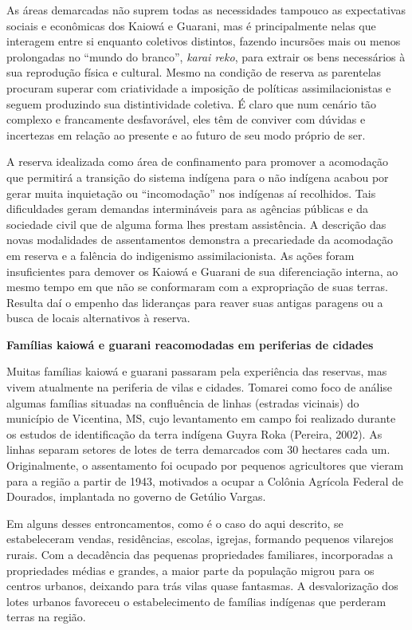 As áreas demarcadas não suprem todas as necessidades tampouco as
expectativas sociais e econômicas dos Kaiowá e Guarani, mas é
principalmente nelas que interagem entre si enquanto coletivos
distintos, fazendo incursões mais ou menos prolongadas no ``mundo do
branco'', \emph{karai reko}, para extrair os bens necessários à sua
reprodução física e cultural. Mesmo na condição de reserva as parentelas
procuram superar com criatividade a imposição de políticas
assimilacionistas e seguem produzindo sua distintividade coletiva. É
claro que num cenário tão complexo e francamente desfavorável, eles têm
de conviver com dúvidas e incertezas em relação ao presente e ao futuro
de seu modo próprio de ser.

A reserva idealizada como área de confinamento para promover a
acomodação que permitirá a transição do sistema indígena para o não
indígena acabou por gerar muita inquietação ou ``incomodação'' nos
indígenas aí recolhidos. Tais dificuldades geram demandas intermináveis
para as agências públicas e da sociedade civil que de alguma forma lhes
prestam assistência. A descrição das novas modalidades de assentamentos
demonstra a precariedade da acomodação em reserva e a falência do
indigenismo assimilacionista. As ações foram insuficientes para demover
os Kaiowá e Guarani de sua diferenciação interna, ao mesmo tempo em que
não se conformaram com a expropriação de suas terras. Resulta daí o
empenho das lideranças para reaver suas antigas paragens ou a busca de
locais alternativos à reserva.

\textbf{Famílias kaiowá e guarani reacomodadas em periferias de cidades}

Muitas famílias kaiowá e guarani passaram pela experiência das reservas,
mas vivem atualmente na periferia de vilas e cidades. Tomarei como foco
de análise algumas famílias situadas na confluência de linhas (estradas
vicinais) do município de Vicentina, MS, cujo levantamento em campo foi
realizado durante os estudos de identificação da terra indígena Guyra
Roka (Pereira, 2002). As linhas separam setores de lotes de terra
demarcados com 30 hectares cada um. Originalmente, o assentamento foi
ocupado por pequenos agricultores que vieram para a região a partir de
1943, motivados a ocupar a Colônia Agrícola Federal de Dourados,
implantada no governo de Getúlio Vargas.

Em alguns desses entroncamentos, como é o caso do aqui descrito, se
estabeleceram vendas, residências, escolas, igrejas, formando pequenos
vilarejos rurais. Com a decadência das pequenas propriedades familiares,
incorporadas a propriedades médias e grandes, a maior parte da população
migrou para os centros urbanos, deixando para trás vilas quase
fantasmas. A desvalorização dos lotes urbanos favoreceu o
estabelecimento de famílias indígenas que perderam terras na região.


